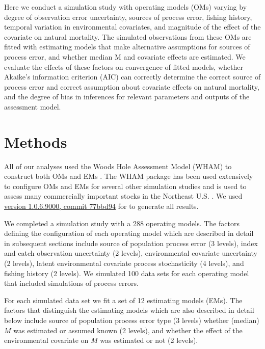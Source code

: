 \documentclass[
  12pt,
]{article}
\begin{document}
Here we conduct a simulation study with operating models (OMs) varying by degree of observation error uncertainty, sources of process error, fishing history, temporal variation in environmental covariates, and magnitude of the effect of the covariate on natural mortality. The simulated observations from these OMs are fitted with estimating models that make alternative assumptions for sources of process error, and whether median M and covariate effects are estimated. We evaluate the effects of these factors on convergence of fitted models, whether Akaike's information criterion (AIC) can correctly determine the correct source of process error and correct assumption about covariate effects on natural mortality, and the degree of bias in inferences for relevant parameters and outputs of the assessment model.

\hypertarget{methods}{%
\section*{Methods}\label{methods}}

All of our analyses used the Woods Hole Assessment Model (WHAM) to construct both OMs and EMs \citep{millerstock20, stockmiller21, milleretal_inreview}. The WHAM package has been used extensively to configure OMs and EMs for several other simulation studies \citep{stocketal21, legaultetal23, lietal24, brittenetal_inreview, lietal_inreview_a} and is used to assess many commercially important stocks in the Northeast U.S. \citep[e.g.,][]{nefsc22, nefsc22a, nefsc24}. We used \href{https://github.com/timjmiller/wham/tree/77bbd946e4881216a439933473d1c58b21c270c3}{version 1.0.6.9000, commit 77bbd94} for to generate all results.

We completed a simulation study with a 288 operating models. The factors defining the configuration of each operating model which are described in detail in subsequent sections include source of population process error (3 levels), index and catch observation uncertainty (2 levels), environmental covariate uncertainty (2 levels), latent environmental covariate process stochasticity (4 levels), and fishing history (2 levels). We simulated 100 data sets for each operating model that included simulations of process errors.

For each simulated data set we fit a set of 12 estimating models (EMs). The factors that distinguish the estimating models which are also described in detail below include source of population process error type (3 levels) whether (median) \(M\) was estimated or assumed known (2 levels), and whether the effect of the environmental covariate on \(M\) was estimated or not (2 levels).
\end{document}
